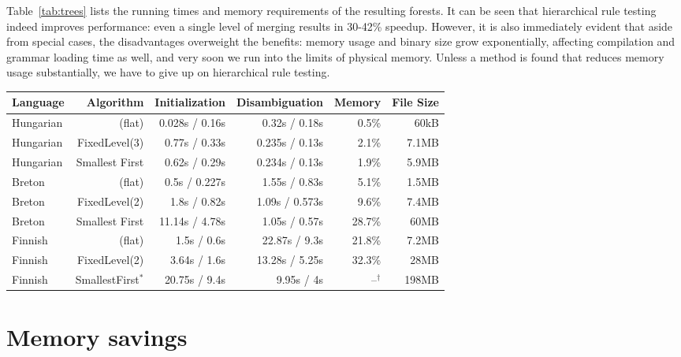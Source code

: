 \documentclass[11pt]{article}
\begin{document}
Table~\ref{tab:trees} lists the running times and memory requirements of the
resulting forests. It can be seen that hierarchical rule testing
indeed improves performance: even a single level of merging results in 30-42\%
speedup. However, it is also immediately evident that aside from special cases,
the disadvantages overweight the benefits: memory usage and binary size grow
exponentially, affecting compilation and grammar loading time as well, and very
soon we run into the limits of physical memory. Unless a method is found that
reduces memory usage substantially, we have to give up on hierarchical rule
testing.

\begin{table*}[h]
  \centering
  \caption{Performance and storage requirements of rule testing trees\\
           $^\ast$ State count limit was 500\hspace{3em}
           $^\dagger$ Did not fit into memory}
  \label{tab:trees}
  \begin{tabular}{ | l | r | r | r | r | r | }
  \hline
  \textbf{Language} & \textbf{Algorithm} & \textbf{Initialization} &
  \textbf{Disambiguation} & \textbf{Memory} & \textbf{File Size} \\
  \hline
  Hungarian & (flat) & 0.028s / 0.16s & 0.32s / 0.18s & 0.5\% & 60kB \\
  Hungarian & FixedLevel(3) & 0.77s / 0.33s & 0.235s / 0.13s & 2.1\% & 7.1MB \\
  Hungarian & Smallest First & 0.62s / 0.29s & 0.234s / 0.13s & 1.9\% & 5.9MB \\
  Breton    & (flat) & 0.5s / 0.227s & 1.55s / 0.83s & 5.1\% & 1.5MB \\
  Breton    & FixedLevel(2) & 1.8s / 0.82s & 1.09s / 0.573s & 9.6\% & 7.4MB \\
  Breton    & Smallest First & 11.14s / 4.78s & 1.05s / 0.57s & 28.7\% & 60MB \\
  Finnish   & (flat) & 1.5s / 0.6s & 22.87s / 9.3s & 21.8\% & 7.2MB \\
  Finnish   & FixedLevel(2) & 3.64s / 1.6s & 13.28s / 5.25s & 32.3\% & 28MB \\
  Finnish   & SmallestFirst$^\ast$ & 20.75s / 9.4s & 9.95s / 4s & --$^\dagger$ & 198MB \\
  \hline
  \end{tabular}
\end{table*}

\section{Memory savings}
\label{sec:memory}
\end{document}

